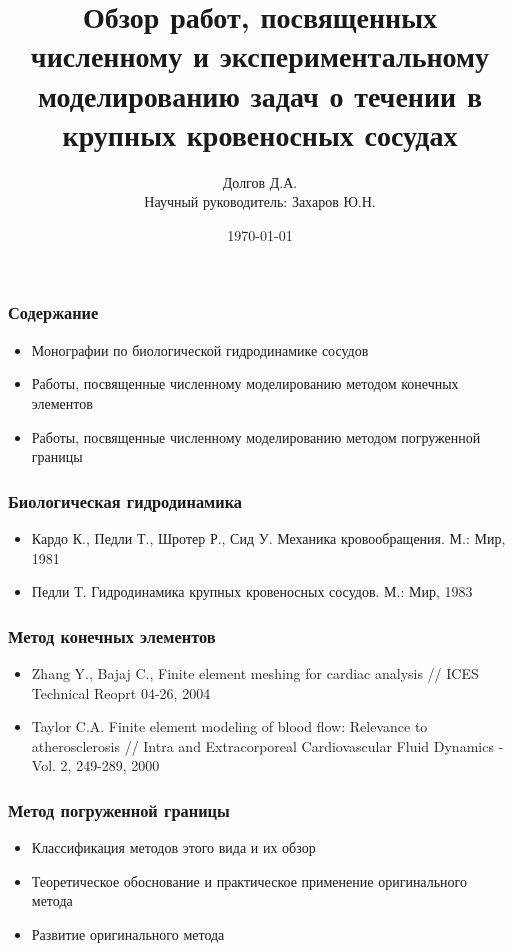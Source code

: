 \documentclass[14pt]{beamer}
\title[Отчет: обзор литературы]{Обзор работ, посвященных численному и экспериментальному моделированию задач о течении в крупных кровеносных сосудах}
\date{\today}
\author[Долгов Д.А.]{Долгов Д.А.\\{\small Научный руководитель: Захаров Ю.Н.}}
\institute{Кемеровский Государственный Университет \\
    \vspace{0.7cm}
    \vspace{0.7cm}
}
\begin{document}
\maketitle

\begin{frame}
\frametitle{Содержание}
\begin{itemize}
    \item Монографии по биологической гидродинамике сосудов
    \item Работы, посвященные численному моделированию методом конечных элементов
    \item Работы, посвященные численному моделированию методом погруженной границы
\end{itemize}
\end{frame}

\begin{frame}
\frametitle{Биологическая гидродинамика}
\begin{itemize}
    \item Кардо К., Педли Т., Шротер Р., Сид У. Механика кровообращения. М.: Мир, 1981
    \item Педли Т. Гидродинамика крупных кровеносных сосудов. М.: Мир, 1983
\end{itemize}
\end{frame}

\begin{frame}
\frametitle{Метод конечных элементов}
\begin{itemize}
    \item Zhang Y., Bajaj C., Finite element meshing for cardiac analysis // ICES Technical Reoprt 04-26, 2004
    \item Taylor C.A. Finite element modeling of blood flow: Relevance to atherosclerosis // Intra and Extracorporeal Cardiovascular Fluid Dynamics - Vol. 2, 249-289, 2000
\end{itemize}
\end{frame}

\begin{frame}
\frametitle{Метод погруженной границы}
\begin{itemize}
    \item Классификация методов этого вида и их обзор
    \item Теоретическое обоснование и практическое применение оригинального метода
    \item Развитие оригинального метода
\end{itemize}
\end{frame}
\end{document}
